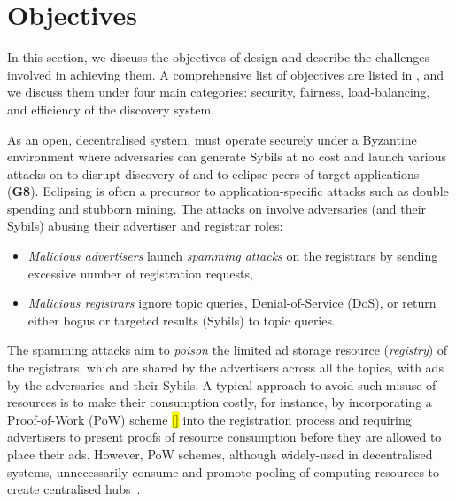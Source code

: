 \section{Objectives}
\label{sec:objectives}

In this section, we discuss the objectives of \sysname design and describe the challenges involved in achieving them. A comprehensive list of objectives are listed in , and we discuss them under four main categories: security, fairness, load-balancing, and efficiency of the discovery system. 

 As an open, decentralised system, \sysname must operate securely under a Byzantine environment where adversaries can generate Sybils at no cost and launch various attacks on \sysname to disrupt discovery of and to eclipse peers of target applications (\textbf{G8}). Eclipsing is often a precursor to application-specific attacks such as double spending and stubborn mining. The attacks on \sysname involve adversaries (and their Sybils) abusing their advertiser and registrar roles: 


\begin{itemize}
 \item \textit{Malicious advertisers} launch \textit{spamming attacks} on the registrars by sending excessive number of registration requests, 
 \item \textit{Malicious registrars} ignore topic queries, \ie Denial-of-Service (DoS), or return either bogus or targeted results (\eg  Sybils) to topic queries.
\end{itemize}

The spamming attacks aim to \textit{poison} the limited ad storage resource (\ie \textit{registry}) of the registrars, which are shared by the advertisers across all the topics, with ads by the adversaries and their Sybils. A typical approach to avoid such misuse of resources is to make their consumption costly, for instance, by incorporating a Proof-of-Work (PoW) scheme \hl{[]} into the registration process and requiring advertisers to present proofs of resource consumption before they are allowed to place their ads. However, PoW schemes, although widely-used in decentralised systems, unnecessarily consume and promote pooling of computing resources to create centralised hubs~\cite{gervais2014bitcoin}. 

